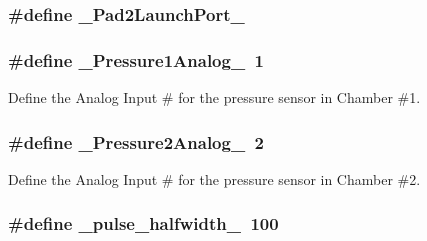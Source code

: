 \hypertarget{launchPad_8ino_af3068802cd6f1921c6f2926b3ea99689}{
\subsubsection[{\-\_\-\-Pad2\-Launch\-Port\-\_\-}]{\setlength{\rightskip}{0pt plus 5cm}\#define {\bf \-\_\-\-Pad2\-Launch\-Port\-\_\-}}}\label{launchPad_8ino_af3068802cd6f1921c6f2926b3ea99689}
\hypertarget{launchPad_8ino_a8dba5b7b5c1c1a33fdda248174d889bd}{
\subsubsection[{\-\_\-\-Pressure1\-Analog\-\_\-}]{\setlength{\rightskip}{0pt plus 5cm}\#define {\bf \-\_\-\-Pressure1\-Analog\-\_\-}~1}}\label{launchPad_8ino_a8dba5b7b5c1c1a33fdda248174d889bd}


\-Define the \-Analog \-Input \# for the pressure sensor in \-Chamber \#1. 

\hypertarget{launchPad_8ino_a4ab75fa969597ccee16103613f86127b}{
\subsubsection[{\-\_\-\-Pressure2\-Analog\-\_\-}]{\setlength{\rightskip}{0pt plus 5cm}\#define {\bf \-\_\-\-Pressure2\-Analog\-\_\-}~2}}\label{launchPad_8ino_a4ab75fa969597ccee16103613f86127b}


\-Define the \-Analog \-Input \# for the pressure sensor in \-Chamber \#2. 

\hypertarget{launchPad_8ino_a9a8dc8e6e75e845a90d783b02b6be855}{
\subsubsection[{\-\_\-pulse\-\_\-halfwidth\-\_\-}]{\setlength{\rightskip}{0pt plus 5cm}\#define {\bf \-\_\-pulse\-\_\-halfwidth\-\_\-}~100}}\label{launchPad_8ino_a9a8dc8e6e75e845a90d783b02b6be855}


